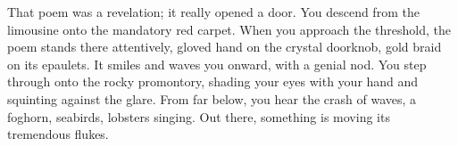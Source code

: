 
That poem was a revelation; it really opened a door. You descend from
the limousine onto the mandatory red carpet. When you approach the
threshold, the poem stands there attentively, gloved hand on the crystal
doorknob, gold braid on its epaulets. It smiles and waves you onward,
with a genial nod. You step through onto the rocky promontory, shading
your eyes with your hand and squinting against the glare. From far
below, you hear the crash of waves, a foghorn, seabirds, lobsters
singing. Out there, something is moving its tremendous flukes.

